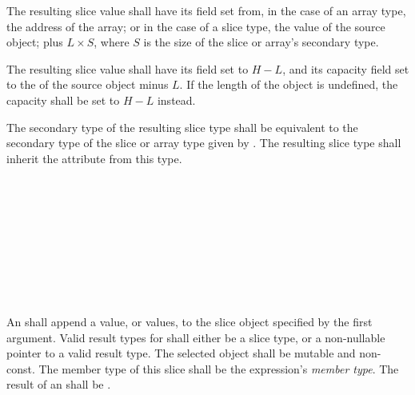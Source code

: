 \specsubsubitem
The resulting slice value shall have its  field set from, in the case
of an array type, the address of the array; or in the case of a slice type, the
 value of the source object; plus $L \times S$, where $S$ is the
size of the slice or array's secondary type.

\specsubsubitem
The resulting slice value shall have its  field set to $H - L$,
and its capacity field set to the  of the source object minus $L$.
If the length of the object is undefined, the capacity shall be set to $H - L$
instead.

\specsubsubitem
The secondary type of the resulting slice type shall be equivalent to the
secondary type of the slice or array type given by
. The resulting slice type shall inherit the
 attribute from this type.


\begin{grammar}
 \\
	 \\
	 \\
	 \\

 \\
	  \terminal{(}  \terminal{,}  \terminal{)} \\
	  \terminal{(}  \terminal{,}   \terminal{)} \\
	  \terminal{(}  \terminal{,}  \terminal{,}  \terminal{)} \\
\end{grammar}

\specsubsubitem
An  shall append a value, or values, to the
slice object specified by the first argument. Valid result types for
 shall either be a slice type, or a non-nullable
pointer to a valid result type. The selected object shall be mutable and
non-const. The member type of this slice shall be the expression's
\textit{member type}. The result of an  shall be
.

